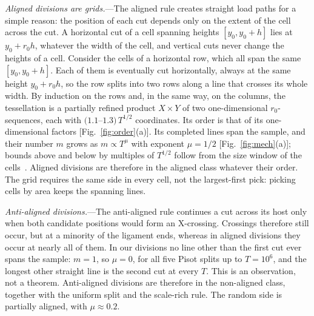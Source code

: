 \documentclass[aps,prl,twocolumn,superscriptaddress,amsmath,amssymb,floatfix]{revtex4-2}
\begin{document}
\textit{Aligned divisions are grids.}---The aligned rule creates straight load paths for a
simple reason: the position of each cut depends only on the extent of the cell across the
cut. A horizontal cut of a cell spanning heights $[y_0,y_0+h]$ lies at $y_0+r_0h$, whatever the
width of the cell, and vertical cuts never change the heights of a cell. Consider the cells of
a horizontal row, which all span the same $[y_0,y_0+h]$. Each of them is eventually cut
horizontally, always at the same height $y_0+r_0h$, so the row splits into two rows along a
line that crosses its whole width. By induction on the rows and, in the same way, on the
columns, the tessellation is a partially refined product $X\times Y$ of two one-dimensional
$r_0$-sequences, each with $(1.1$--$1.3)\,T^{1/2}$ coordinates. Its order is that of its
one-dimensional factors [Fig.~\ref{fig:order}(a)]. Its completed lines span the sample, and
their number $m$ grows as $m\propto T^{\mu}$ with exponent $\mu=1/2$ [Fig.~\ref{fig:mech}(a)];
bounds above and below by multiples of $T^{1/2}$ follow from the size window of the
cells~\cite{supp}. Aligned divisions are therefore in the aligned class whatever their order. The grid requires the same
side in every cell, not the largest-first pick: picking cells by area keeps the spanning
lines.

\textit{Anti-aligned divisions.}---The anti-aligned rule continues a cut across its host only
when both candidate positions would form an X-crossing. Crossings therefore still occur, but at
a minority of the ligament ends, whereas in aligned divisions they occur at nearly all of them.
In our divisions no line other than the first cut ever spans the sample: $m=1$, so $\mu=0$, for all five
Pisot splits up to $T=10^{6}$, and the longest other straight line is the second cut at every
$T$. This is an observation, not a theorem. Anti-aligned divisions are therefore in the
non-aligned class, together with the uniform split and the scale-rich rule. The random side is
partially aligned, with $\mu\approx0.2$.
\end{document}
